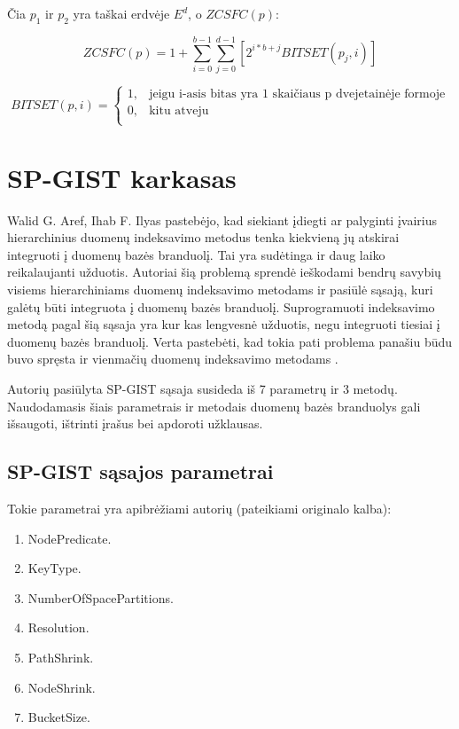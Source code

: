 Čia $p_1$ ir $p_2$ yra taškai erdvėje $E^d$, o $ZCSFC(p)$:

\begin{equation}
	ZCSFC(p) = 1 + \sum_{i=0}^{b-1} \sum_{j=0}^{d-1} [2^{i*b+j} BITSET(p_j, i)]
\label{eq:ZCurveSFCValue}
\end{equation}


\begin{equation}
	BITSET(p, i)=
\begin{cases}
	1,& \text{jeigu } \text{i-asis bitas yra 1 skaičiaus p dvejetainėje formoje}\\
	0,& \text{kitu atveju}\\
\end{cases}
\label{eq:Bitset}
\end{equation}






\section{SP-GIST karkasas}

Walid G. Aref, Ihab F. Ilyas \cite{aref2001sp} pastebėjo, kad siekiant įdiegti ar palyginti įvairius hierarchinius duomenų indeksavimo metodus tenka kiekvieną jų atskirai integruoti į duomenų bazės branduolį.
Tai yra sudėtinga ir daug laiko reikalaujanti užduotis.
Autoriai šią problemą sprendė ieškodami bendrų savybių visiems hierarchiniams duomenų indeksavimo metodams ir pasiūlė sąsają, kuri galėtų būti integruota į duomenų bazės branduolį.
Suprogramuoti indeksavimo metodą pagal šią sąsaja yra kur kas lengvesnė užduotis, negu integruoti tiesiai į duomenų bazės branduolį.
Verta pastebėti, kad tokia pati problema panašiu būdu buvo spręsta ir vienmačių duomenų indeksavimo metodams \cite{hellerstein1995generalized}.

Autorių pasiūlyta SP-GIST sąsaja susideda iš 7 parametrų ir 3 metodų.
Naudodamasis šiais parametrais ir metodais duomenų bazės branduolys gali išsaugoti, ištrinti įrašus bei apdoroti užklausas.

\subsection{SP-GIST sąsajos parametrai}
Tokie parametrai yra apibrėžiami autorių (pateikiami originalo kalba):
\begin{enumerate}
	\item NodePredicate.
	\item KeyType.
	\item NumberOfSpacePartitions.
	\item Resolution.
	\item PathShrink.
	\item NodeShrink.
	\item BucketSize.
\end{enumerate}

